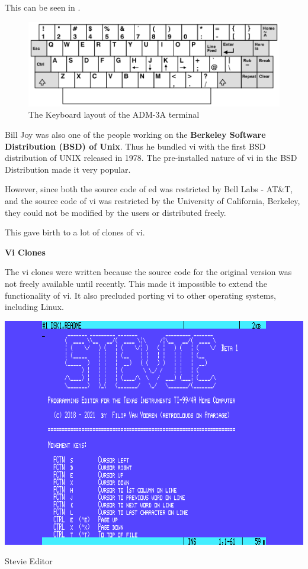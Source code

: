 This can be seen in .

\begin{figure}[h!]
  \includegraphics{images/png/adm3a.png}
  \caption{The Keyboard layout of the ADM-3A terminal}
\end{figure}


Bill Joy was also one of the people working on the
\textbf{Berkeley Software Distribution (BSD) of Unix}.
Thus he bundled vi with the first BSD distribution of UNIX
released in 1978.
The pre-installed nature of vi in the BSD Distribution
made it very popular.

However, since both the source code of ed was restricted by
Bell Labs - AT\&T, and the source code of vi was restricted
by the University of California, Berkeley,
they could not be modified by the users or distributed freely.

This gave birth to a lot of clones of vi.

\textbf{Vi Clones}

The vi clones were written because the source code for the original version was not freely available until recently. This made it impossible to extend the functionality of vi. It also precluded porting vi to other operating systems, including Linux.

\begin{marginfigure}
  \includegraphics{images/png/stevie.png}
  \caption{Stevie Editor}
\end{marginfigure}

